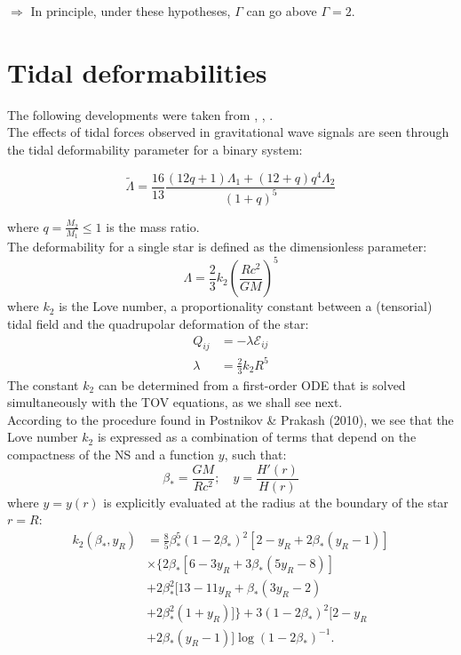 \documentclass[12pt]{report}
\begin{document}
	$\Rightarrow$ In principle, under these hypotheses, $\Gamma$ can go above $\Gamma=2$.
	
	\chapter{Tidal deformabilities}
	The following developments were taken from \cite{2018PhRvD..98f3020Z}, \cite{2010PhRvD..82b4016P}, \cite{2010PhRvD..81l3016H}.\\
	
	The effects of tidal forces observed in gravitational wave signals are seen through the tidal deformability parameter for a binary system:
	
	\begin{equation}\tilde{\Lambda} = \frac{16}{13} \frac{(12q+1)\Lambda_1 + (12+q)q^4\Lambda_2}{(1+q)^5}\end{equation}
	
	where $q = \frac{M_2}{M_1} \leq 1$ is the mass ratio.\\
	
	The deformability for a single star is defined as the dimensionless parameter:
	\begin{equation}
		\Lambda = \frac{2}{3}k_{2}\left(\frac{Rc^2}{GM}\right)^5
	\end{equation}
	where $k_2$ is the Love number, a proportionality constant between a (tensorial) tidal field and the quadrupolar deformation of the star:
	\begin{align}
		Q_{ij} &= -\lambda \mathcal{E}_{ij}\\
		\lambda &= \frac{2}{3}k_2R^5 
	\end{align}
	The constant $k_2$ can be determined from a first-order ODE that is solved simultaneously with the TOV equations, as we shall see next.\\
	
	According to the procedure found in Postnikov \& Prakash (2010), we see that the Love number $k_2$ is expressed as a combination of terms that depend on the compactness of the NS and a function $y$, such that:
	\begin{equation}\beta_* = \frac{GM}{Rc^2} ; \quad y = \frac{H'(r)}{H(r)}
	\end{equation}
	where $y=y(r)$ is explicitly evaluated at the radius at the boundary of the star $r=R$:
	\begin{align*}
		k_2(\beta_*,y_R) &= \frac{8}{5}\beta_*^5(1-2\beta_*)^2[2-y_R+2\beta_*(y_R-1)] \\
		&\times \{2\beta_*[6-3y_R+3\beta_*(5y_R-8)] \\
		&+ 2\beta_*^2[13-11y_R+\beta_*(3y_R-2) \\
		&+ 2\beta_*^2(1+y_R)]\} + 3(1-2\beta_*)^2[2-y_R \\
		&+ 2\beta_*(y_R-1)]\log(1-2\beta_*)^{-1}.
	\end{align*}
	
\end{document}
